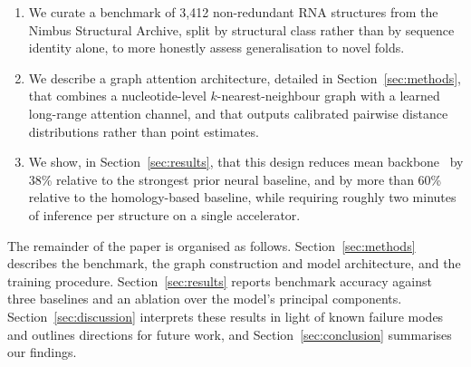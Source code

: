 \begin{enumerate}[leftmargin=1.4em]
  \item We curate a benchmark of 3{,}412 non-redundant RNA structures from the Nimbus Structural Archive, split by structural class rather than by sequence identity alone, to more honestly assess generalisation to novel folds.
  \item We describe a graph attention architecture, detailed in Section~\ref{sec:methods}, that combines a nucleotide-level $k$-nearest-neighbour graph with a learned long-range attention channel, and that outputs calibrated pairwise distance distributions rather than point estimates.
  \item We show, in Section~\ref{sec:results}, that this design reduces mean backbone \rmsd\ by 38\% relative to the strongest prior neural baseline, and by more than 60\% relative to the homology-based baseline, while requiring roughly two minutes of inference per structure on a single accelerator.
\end{enumerate}

The remainder of the paper is organised as follows. Section~\ref{sec:methods} describes the benchmark, the graph construction and model architecture, and the training procedure. Section~\ref{sec:results} reports benchmark accuracy against three baselines and an ablation over the model's principal components. Section~\ref{sec:discussion} interprets these results in light of known failure modes and outlines directions for future work, and Section~\ref{sec:conclusion} summarises our findings.
